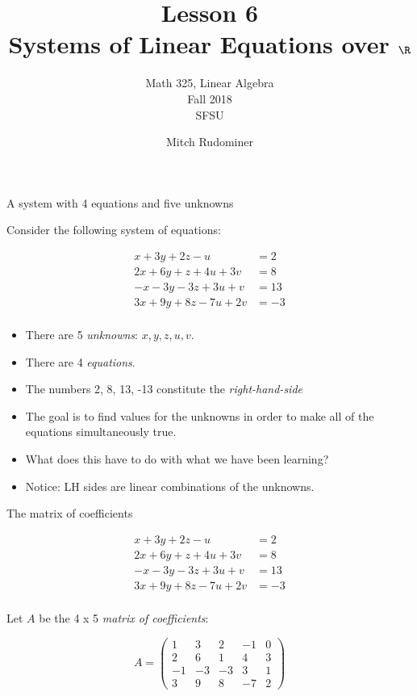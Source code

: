 \documentclass{beamer}
\title{Lesson 6 \\ Systems of Linear Equations over $\R$}
\subtitle{Math 325, Linear Algebra \\ Fall 2018 \\ SFSU}
\author{Mitch Rudominer}
\date{}
\begin{document}
\begin{frame}
  \titlepage
\end{frame}

\begin{frame}{A system with 4 equations and five unknowns}

Consider the following system of equations:

\begin{align*}
 x + 3y + 2z - u  \qquad &= 2 \\
2x + 6y + z + 4u + 3v  &= 8 \\
-x -3y  -3z + 3u + v  &= 13 \\
3x + 9y + 8z  -7u + 2v  &= -3 \\
\end{align*}

\begin{itemize}
\item There are 5 \emph{unknowns}: $x, y, z, u, v$.
\item There are 4 \emph{equations}.
\item The numbers 2, 8, 13, -13 constitute the \emph{right-hand-side}
\item The goal is to find values for the unknowns in order to make all of the
equations simultaneously true.
\item What does this have to do with what we have been learning?
\item Notice: LH sides are linear combinations of the unknowns.
\end{itemize}

\end{frame}


\begin{frame}{The matrix of coefficients}

\begin{align*}
 x + 3y + 2z - u  \qquad &= 2 \\
2x + 6y + z + 4u + 3v  &= 8 \\
-x -3y  -3z + 3u + v  &= 13 \\
3x + 9y + 8z  -7u + 2v  &= -3 \\
\end{align*}

Let $A$ be the 4 x 5 \emph{matrix of coefficients}:

$$
A =
\begin{pmatrix}
1 & 3 & 2 & -1 & 0 \\
2 & 6 & 1 & 4 & 3\\
-1 & -3 & -3 & 3 & 1 \\
3 & 9 & 8 & -7 & 2
\end{pmatrix}
$$

\end{frame}
\end{document}
